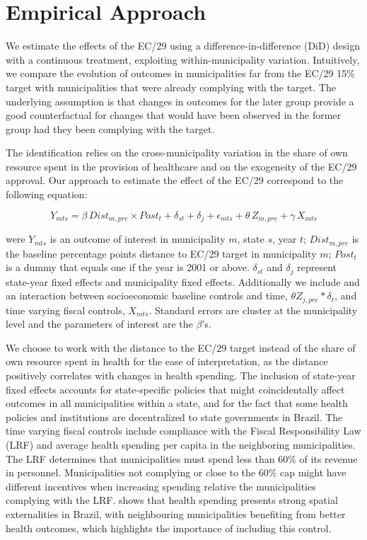 \section{Empirical Approach}\label{sec:emp}

We estimate the effects of the EC/29 using a difference-in-difference (DiD) design with a continuous treatment, exploiting within-municipality variation. Intuitively, we compare the evolution of outcomes in municipalities far from the EC/29 15\% target with municipalities that were already complying with the target. The underlying assumption is that changes in outcomes for the later group provide a good counterfactual for changes that would have been observed in the former group had they been complying with the target. 

The identification relies on the cross-municipality variation in the share of own resource spent in the provision of healthcare and on the exogeneity of the EC/29 approval. Our approach to estimate the effect of the EC/29 correspond to the following equation:

\begin{equation} \label{eq:1}
    Y_{mts} = \beta \, Dist_{m,pre} \times Post_t  +  \delta_{st} + \delta_j + \epsilon_{mts} + \theta \, Z_{m,pre} + \gamma \, X_{mts}
\end{equation}

were $Y_{mts}$ is an outcome of interest in municipality $m$, state $s$, year $t$; $Dist_{m,pre}$ is the baseline percentage points distance to EC/29 target in municipality $m$; $Post_t$ is a dummy that equals one if the year is 2001 or above. $\delta_{st}$ and $\delta_j$ represent state-year fixed effects and municipality fixed effects. Additionally we include and an interaction between socioeconomic baseline controls and time, $\theta Z_{j,pre} * \delta_{t}$, and time varying fiscal controls, $X_{mts}$. Standard errors are cluster at the municipality level and the parameters of interest are the $\beta$'s.

We choose to work with the distance to the EC/29 target instead of the share of own resource spent in health for the ease of interpretation, as the distance positively correlates with changes in health spending. The inclusion of state-year fixed effects accounts for state-specific policies that might coincidentally affect outcomes in all municipalities within a state, and for the fact that some health policies and institutions are decentralized to state governments in Brazil. The time varying fiscal controls include compliance with the Fiscal Responsibility Law (LRF) \citep{lrf} and average health spending per capita in the neighboring municipalities. The LRF determines that municipalities must spend less than 60\% of its revenue in personnel. Municipalities not complying or close to the 60\% cap might have different incentives when increasing spending relative the municipalities complying with the LRF. \cite{castro2021effects} shows that health spending presents strong spatial externalities in Brazil, with neighbouring municipalities benefiting from better health outcomes, which highlights the importance of including this control.


